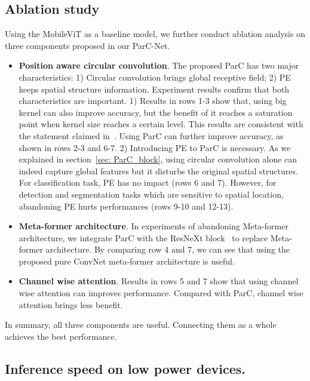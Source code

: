 \documentclass[10pt,twocolumn,letterpaper]{article}
\begin{document}
\subsection{Ablation study}

Using the MobileViT as a baseline model, we further conduct ablation analysis on three components proposed in our ParC-Net. 

\begin{itemize}

\item {\bf Position aware circular convolution}. The proposed ParC has two major characteristics: 1) Circular convolution brings global receptive field; 2) PE keeps spatial structure information. Experiment results confirm that both characteristics are important. 1) Results in rows 1-3 show that, using big kernel can also improve accuracy, but the benefit of it reaches a saturation point when kernel size reaches a certain level. This results are consistent with the statement claimed in~\cite{liu2022convnet}. Using ParC can further improve accuracy, as shown in rows 2-3 and 6-7. 2) Introducing PE to ParC is necessary. As we explained in section~\ref{sec: ParC_block}, using circular convolution alone can indeed capture global features but it disturbs the original spatial structures. For classification task, PE has no impact (rows 6 and 7). However, for detection and segmentation tasks which are sensitive to spatial location, abandoning PE hurts performances (rows 9-10 and 12-13). 

\item {\bf Meta-former architecture}. In experiments of abandoning Meta-former architecture, we integrate ParC with the ResNeXt block~\cite{xie2017aggregated} to replace Meta-former architecture. By comparing row 4 and 7, we can see that using the proposed pure ConvNet meta-former architecture is useful. 

\item {\bf Channel wise attention}. Results in rows 5 and 7 show that using channel wise attention can improves performance. Compared with ParC, channel wise attention brings less benefit.

\end{itemize}

In summary, all three components are useful. Connecting them as a whole achieves the best performance.


\subsection{Inference speed on low power devices.}
\label{sec: inference}
\end{document}
